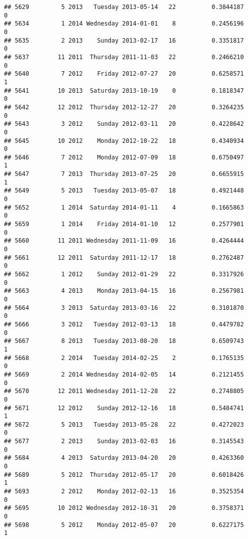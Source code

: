 \documentclass[
]{article}
\begin{document}
\begin{verbatim}
## 5629         5 2013   Tuesday 2013-05-14   22          0.3844187             0
## 5634         1 2014 Wednesday 2014-01-01    8          0.2456196             0
## 5635         2 2013    Sunday 2013-02-17   16          0.3351817             0
## 5637        11 2011  Thursday 2011-11-03   22          0.2466210             0
## 5640         7 2012    Friday 2012-07-27   20          0.6258571             1
## 5641        10 2013  Saturday 2013-10-19    0          0.1818347             0
## 5642        12 2012  Thursday 2012-12-27   20          0.3264235             0
## 5643         3 2012    Sunday 2012-03-11   20          0.4228642             0
## 5645        10 2012    Monday 2012-10-22   18          0.4340934             0
## 5646         7 2012    Monday 2012-07-09   18          0.6750497             1
## 5647         7 2013  Thursday 2013-07-25   20          0.6655915             1
## 5649         5 2013   Tuesday 2013-05-07   18          0.4921448             0
## 5652         1 2014  Saturday 2014-01-11    4          0.1665863             0
## 5659         1 2014    Friday 2014-01-10   12          0.2577901             0
## 5660        11 2011 Wednesday 2011-11-09   16          0.4264444             0
## 5661        12 2011  Saturday 2011-12-17   18          0.2762487             0
## 5662         1 2012    Sunday 2012-01-29   22          0.3317926             0
## 5663         4 2013    Monday 2013-04-15   16          0.2567981             0
## 5664         3 2013  Saturday 2013-03-16   22          0.3101870             0
## 5666         3 2012   Tuesday 2012-03-13   18          0.4479782             0
## 5667         8 2013   Tuesday 2013-08-20   18          0.6509743             1
## 5668         2 2014   Tuesday 2014-02-25    2          0.1765135             0
## 5669         2 2014 Wednesday 2014-02-05   14          0.2121455             0
## 5670        12 2011 Wednesday 2011-12-28   22          0.2748805             0
## 5671        12 2012    Sunday 2012-12-16   18          0.5484741             1
## 5672         5 2013   Tuesday 2013-05-28   22          0.4272023             0
## 5677         2 2013    Sunday 2013-02-03   16          0.3145543             0
## 5684         4 2013  Saturday 2013-04-20   20          0.4263360             0
## 5689         5 2012  Thursday 2012-05-17   20          0.6018426             1
## 5693         2 2012    Monday 2012-02-13   16          0.3525354             0
## 5695        10 2012 Wednesday 2012-10-31   20          0.3758371             0
## 5698         5 2012    Monday 2012-05-07   20          0.6227175             1

\end{verbatim}
\end{document}
